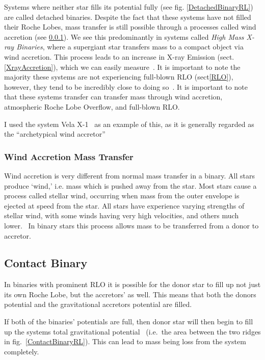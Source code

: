 \documentclass[12pt, a4paper]{article}
\begin{document}
        Systems where neither star fills its potential fully (see fig. \ref{DetachedBinaryRL}) are called detached binaries. Despite the fact that these systems have not filled their Roche Lobes, mass transfer is still possible through a processes called wind accretion (see \ref{WindAccretion}). We see this predominantly in systems called \textit{High Mass X-ray Binaries}, where a supergiant star transfers mass to a compact object via wind accretion. This process leads to an increase in X-ray Emission (sect. \ref{XrayAccretion}), which we can easily measure~\parencite{TaurisvandenHeuvel+2023}. It is important to note the majority these systems are not experiencing full-blown RLO (sect\ref{RLO}), however, they tend to be incredibly close to doing so~\parencite{TaurisvandenHeuvel+2023}. It is important to note that these systems transfer can transfer mass through wind accretion, atmospheric Roche Lobe Overflow, and full-blown RLO. 

        I used the system Vela X-1~\parencite{Kretschmar_2021} as an example of this, as it is generally regarded as the ``archetypical wind accretor''~\parencite{Kretschmar_2021} 

        \subsubsection{Wind Accretion Mass Transfer} \label{WindAccretion}
        Wind accretion is very different from normal mass transfer in a binary. All stars produce `wind,' i.e. mass which is pushed away from the star. Most stars cause a process called stellar wind, occurring when mass from the outer envelope is ejected at speed from the star. All stars have experience varying strengths of stellar wind, with some winds having very high velocities, and others much lower.~\parencite{Lamers_1999} In binary stars this process allows mass to be transferred from a donor to accretor.
        
        

        \subsection{\centering Contact Binary}
        In binaries with prominent RLO it is possible for the donor star to fill up not just its own Roche Lobe, but the accretors' as well. This means that both the donors  potential and the gravitational accretors potential are filled.
        
        If both of the binaries' potentials are full, then donor star will then begin to fill up the systems total gravitational potential \ (i.e.\ the area between the two ridges in fig.~\ref{ContactBinaryRL}). This can lead to mass being loss from the system completely. 
        
\end{document}
